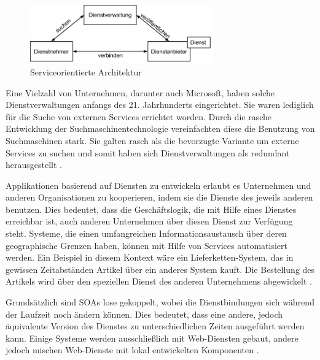 \begin{figure}[h]
\centering
\includegraphics[width=0.7\textwidth,keepaspectratio]{images/soa.png}
\caption[
Serviceorientierte Architektur, Urldate: 04.2014 \newline
\small\texttt{\url{http://www.w3.org/2003/Talks/0521-hh-wsa/slide5-0.html}}
]{Serviceorientierte Architektur}
\label{fig:2_SOA}
\end{figure}

Eine Vielzahl von Unternehmen, darunter auch Microsoft, haben solche Dienstverwaltungen anfangs des 21. Jahrhunderts eingerichtet. Sie waren lediglich für die Suche von externen Services errichtet worden. Durch die rasche Entwicklung der Suchmaschinentechnologie vereinfachten diese die Benutzung von Suchmaschinen stark. Sie galten rasch als die bevorzugte Variante um externe Services zu suchen und somit haben sich Dienstverwaltungen als redundant herausgestellt \citereset \autocite[siehe][S. 511]{Sommerville.2011}.

Applikationen basierend auf Diensten zu entwickeln erlaubt es Unternehmen und anderen Organisationen zu kooperieren, indem sie die Dienste des jeweils anderen benutzen. Dies bedeutet, dass die Geschäftslogik, die mit Hilfe eines Dienstes erreichbar ist, auch anderen Unternehmen über diesen Dienst zur Verfügung steht. Systeme, die einen umfangreichen Informationsaustausch über deren geographische Grenzen haben, können mit Hilfe von Services automatisiert werden. Ein Beispiel in diesem Kontext wäre ein Lieferketten-System, das in gewissen Zeitabständen Artikel über ein anderes System kauft.
Die Bestellung des Artikels wird über den speziellen Dienst des anderen Unternehmens abgewickelt \citereset \autocite[siehe][S. 512]{Sommerville.2011}.

Grundsätzlich sind SOAs lose gekoppelt, wobei die Dienstbindungen sich während der Laufzeit noch ändern können. Dies bedeutet, dass eine andere, jedoch äquivalente Version des Dienstes zu unterschiedlichen Zeiten ausgeführt werden kann. Einige Systeme werden ausschließlich mit Web-Diensten gebaut, andere jedoch mischen Web-Dienste mit lokal entwickelten Komponenten \citereset \autocite[siehe][S. 512]{Sommerville.2011}.

